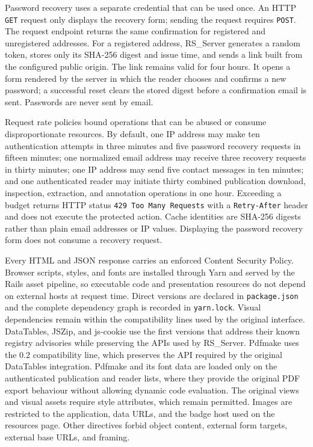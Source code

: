 \documentclass[a4paper, english]{article}
\newcommand{\rsserver}{RS\_Server\xspace}
\begin{document}
Password recovery uses a separate credential that can be used once. An HTTP \verb|GET| request only displays the recovery form; sending the request requires \verb|POST|. The request endpoint returns the same confirmation for registered and unregistered addresses. For a registered address, \rsserver generates a random token, stores only its SHA-256 digest and issue time, and sends a link built from the configured public origin. The link remains valid for four hours. It opens a form rendered by the server in which the reader chooses and confirms a new password; a successful reset clears the stored digest before a confirmation email is sent. Passwords are never sent by email.

Request rate policies bound operations that can be abused or consume disproportionate resources. By default, one IP address may make ten authentication attempts in three minutes and five password recovery requests in fifteen minutes; one normalized email address may receive three recovery requests in thirty minutes; one IP address may send five contact messages in ten minutes; and one authenticated reader may initiate thirty combined publication download, inspection, extraction, and annotation operations in one hour. Exceeding a budget returns HTTP status \verb|429 Too Many Requests| with a \verb|Retry-After| header and does not execute the protected action. Cache identities are SHA-256 digests rather than plain email addresses or IP values. Displaying the password recovery form does not consume a recovery request.

Every HTML and JSON response carries an enforced Content Security Policy. Browser scripts, styles, and fonts are installed through Yarn and served by the Rails asset pipeline, so executable code and presentation resources do not depend on external hosts at request time. Direct versions are declared in \verb|package.json| and the complete dependency graph is recorded in \verb|yarn.lock|. Visual dependencies remain within the compatibility lines used by the original interface. DataTables, JSZip, and js-cookie use the first versions that address their known registry advisories while preserving the APIs used by \rsserver. Pdfmake uses the 0.2 compatibility line, which preserves the API required by the original DataTables integration. Pdfmake and its font data are loaded only on the authenticated publication and reader lists, where they provide the original PDF export behaviour without allowing dynamic code evaluation. The original views and visual assets require style attributes, which remain permitted. Images are restricted to the application, data URLs, and the badge host used on the resources page. Other directives forbid object content, external form targets, external base URLs, and framing.
\end{document}
